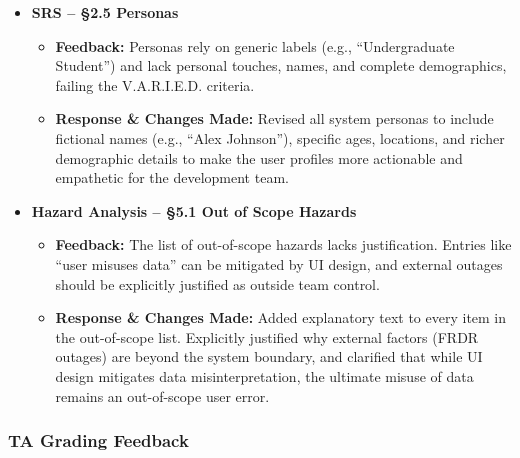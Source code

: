 \documentclass{article}
\begin{document}
\begin{itemize}
    \item \textbf{SRS -- \S 2.5 Personas}
    \begin{itemize}
        \item \textbf{Feedback:} Personas rely on generic labels (e.g., ``Undergraduate Student'') and lack personal touches, names, and complete demographics, failing the V.A.R.I.E.D. criteria.
        \item \textbf{Response \& Changes Made:} Revised all system personas to include fictional names (e.g., ``Alex Johnson''), specific ages, locations, and richer demographic details to make the user profiles more actionable and empathetic for the development team.
    \end{itemize}

    \item \textbf{Hazard Analysis -- \S 5.1 Out of Scope Hazards}
    \begin{itemize}
        \item \textbf{Feedback:} The list of out-of-scope hazards lacks justification. Entries like ``user misuses data'' can be mitigated by UI design, and external outages should be explicitly justified as outside team control.
        \item \textbf{Response \& Changes Made:} Added explanatory text to every item in the out-of-scope list. Explicitly justified why external factors (FRDR outages) are beyond the system boundary, and clarified that while UI design mitigates data misinterpretation, the ultimate misuse of data remains an out-of-scope user error.
    \end{itemize}
\end{itemize}

\vspace{\baselineskip}
\subsubsection*{TA Grading Feedback}
\end{document}
